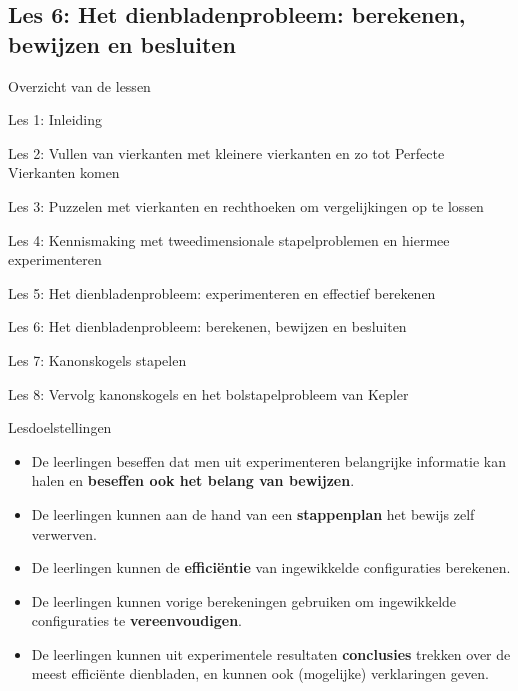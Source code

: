 \documentclass[dutch]{beamer}
\begin{document}



\subsection{Les 6: Het dienbladenprobleem: berekenen, bewijzen en besluiten}
\begin{frame}
{Overzicht van de lessen}
\begin{list}{\quad}{}
\item Les 1: Inleiding
\item Les 2: Vullen van vierkanten met kleinere vierkanten en zo tot Perfecte Vierkanten komen
\item Les 3: Puzzelen met vierkanten en rechthoeken om vergelijkingen op te lossen
\item Les 4: Kennismaking met tweedimensionale stapelproblemen en hiermee experimenteren
\item Les 5: Het dienbladenprobleem: experimenteren en effectief berekenen
\item {\color{blue}Les 6: Het dienbladenprobleem: berekenen, bewijzen en besluiten}
\item Les 7: Kanonskogels stapelen
\item Les 8: Vervolg kanonskogels en het bolstapelprobleem van Kepler
\end{list}
\end{frame}

\begin{frame}{Lesdoelstellingen}
\begin{itemize}
\item De leerlingen beseffen dat men uit experimenteren belangrijke informatie kan halen en \textbf{beseffen ook het belang van bewijzen}.
\item De leerlingen kunnen aan de hand van een \textbf{stappenplan} het bewijs zelf verwerven.
\item De leerlingen kunnen de \textbf{effici\"{e}ntie} van ingewikkelde configuraties berekenen.
\item De leerlingen kunnen vorige berekeningen gebruiken om ingewikkelde configuraties te \textbf{vereenvoudigen}.
\item De leerlingen kunnen uit experimentele resultaten \textbf{conclusies} trekken over de meest effici\"{e}nte dienbladen, en kunnen ook (mogelijke) verklaringen geven.
\end{itemize}
\end{frame}
\end{document}

